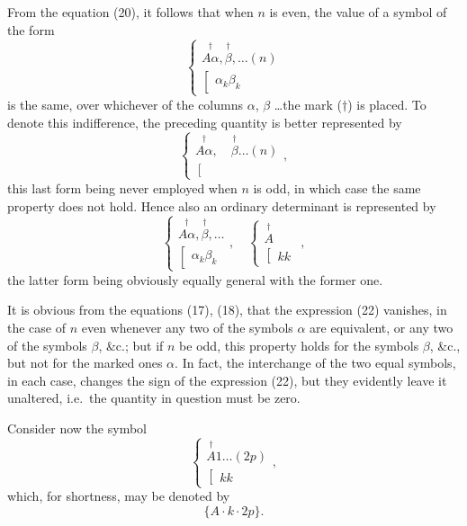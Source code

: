 \documentclass[11pt,a4paper]{article}
\theoremstyle{plain}
\theoremstyle{definition}
\theoremstyle{remark}
\begin{document}
From the equation (20), it follows that when $n$ is even, the value of a symbol
of the form
\[
\left\{\begin{array}{c}
\stackrel{\dagger}{A\alpha}, \stackrel{\dagger}{\beta}, \ldots (n) \\
\left[\begin{array}{c}
\alpha_k\beta_k
\end{array}\right.
\end{array}\right.
\tag{22}
\]
is the same, over whichever of the columns $\alpha$, $\beta$ \ldots the mark ($\dagger$) is placed. To
denote this indifference, the preceding quantity is better represented by
\[
\left\{\begin{array}{c}
\stackrel{\dagger}{A\alpha}, \quad \stackrel{\dagger}{\beta} \ldots (n) \\
\left[\begin{array}{c}
\\
\end{array}\right.
\end{array}\right.
\tag{23},
\]
this last form being never employed when $n$ is odd, in which case the same property
does not hold. Hence also an ordinary determinant is represented by
\[
\left\{\begin{array}{c}
\stackrel{\dagger}{A\alpha}, \stackrel{\dagger}{\beta}, \ldots \\
\left[\begin{array}{c}
\alpha_k\beta_k
\end{array}\right.
\end{array}\right.
, \quad
\left\{\begin{array}{c}
\stackrel{\dagger}{A} \\
\left[\begin{array}{c}
kk
\end{array}\right.
\end{array}\right.
\tag{24},
\]
the latter form being obviously equally general with the former one.

It is obvious from the equations (17), (18), that the expression (22) vanishes, in
the case of $n$ even whenever any two of the symbols $\alpha$ are equivalent, or any two
of the symbols $\beta$, \&c.; but if $n$ be odd, this property holds for the symbols $\beta$, \&c.,
but not for the marked ones $\alpha$. In fact, the interchange of the two equal symbols,
in each case, changes the sign of the expression (22), but they evidently leave it
unaltered, i.e.\ the quantity in question must be zero.

Consider now the symbol
\[
\left\{\begin{array}{c}
\stackrel{\dagger}{A} 1 \ldots (2p) \\
\left[\begin{array}{c}
kk
\end{array}\right.
\end{array}\right.
\tag{25},
\]
which, for shortness, may be denoted by
\[
\{A \cdot k \cdot 2p\}
\tag{26}.
\]
\end{document}
